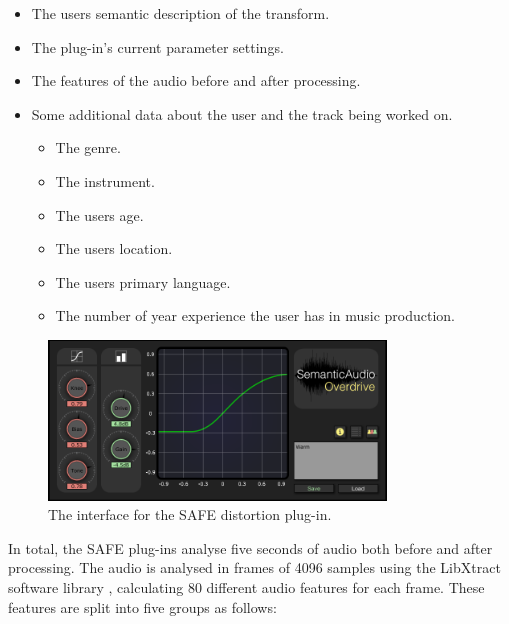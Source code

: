 		\begin{itemize}
			\item The users semantic description of the transform.
			\item The plug-in's current parameter settings.
			\item The features of the audio before and after processing.
			\item Some additional data about the user and the track being worked on.
			\begin{itemize}
				\item The genre.
				\item The instrument.
				\item The users age.
				\item The users location.
				\item The users primary language.
				\item The number of year experience the user has in music production.
			\end{itemize}
		\end{itemize}

		\begin{figure}[h!]
			\centering
			\includegraphics[width=0.8\textwidth]{chapter4/Images/SAFEDistortion.png}
			\caption{The interface for the SAFE distortion plug-in.}
			\label{fig:SAFE-Distortion}
		\end{figure}

		In total, the SAFE plug-ins analyse five seconds of audio both before and after processing. The audio is
		analysed in frames of 4096 samples using the LibXtract software library \citep{bullock2007libxtract},
		calculating 80 different audio features for each frame. These features are split into five groups as
		follows:

